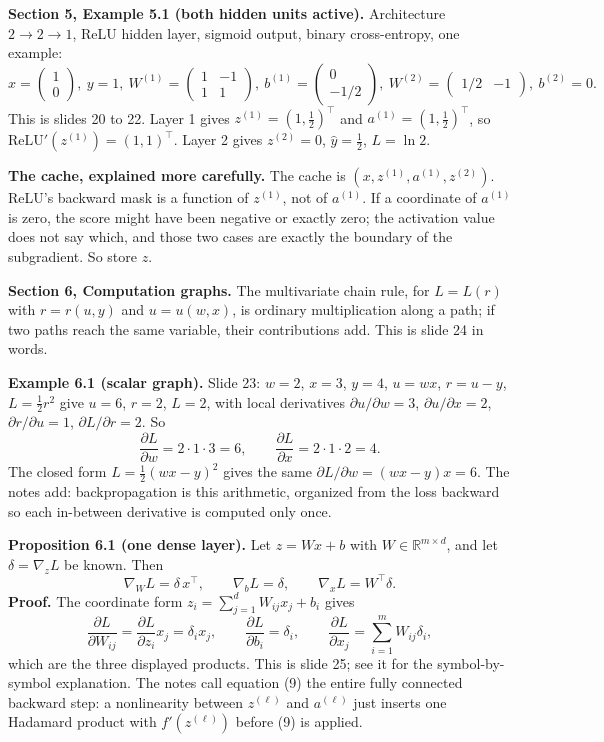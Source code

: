 \textbf{Section 5, Example 5.1 (both hidden units active).} Architecture $2\to2\to1$, ReLU hidden layer, sigmoid output, binary cross-entropy, one example:
\[
x=\begin{pmatrix}1\\0\end{pmatrix},\ y=1,\ W^{(1)}=\begin{pmatrix}1&-1\\1&1\end{pmatrix},\ b^{(1)}=\begin{pmatrix}0\\-1/2\end{pmatrix},\ W^{(2)}=\begin{pmatrix}1/2&-1\end{pmatrix},\ b^{(2)}=0. \tag{8}
\]
This is slides 20 to 22. Layer 1 gives $z^{(1)}=(1,\tfrac12)^\top$ and $a^{(1)}=(1,\tfrac12)^\top$, so $\text{ReLU}'(z^{(1)})=(1,1)^\top$. Layer 2 gives $z^{(2)}=0$, $\hat{y}=\tfrac12$, $L=\ln2$.

\textbf{The cache, explained more carefully.} The cache is $(x,z^{(1)},a^{(1)},z^{(2)})$. ReLU's backward mask is a function of $z^{(1)}$, not of $a^{(1)}$. If a coordinate of $a^{(1)}$ is zero, the score might have been negative or exactly zero; the activation value does not say which, and those two cases are exactly the boundary of the subgradient. So store $z$.

\textbf{Section 6, Computation graphs.} The multivariate chain rule, for $L=L(r)$ with $r=r(u,y)$ and $u=u(w,x)$, is ordinary multiplication along a path; if two paths reach the same variable, their contributions add. This is slide 24 in words.

\textbf{Example 6.1 (scalar graph).} Slide 23: $w=2$, $x=3$, $y=4$, $u=wx$, $r=u-y$, $L=\tfrac12r^2$ give $u=6$, $r=2$, $L=2$, with local derivatives $\partial u/\partial w=3$, $\partial u/\partial x=2$, $\partial r/\partial u=1$, $\partial L/\partial r=2$. So
\[
\frac{\partial L}{\partial w}=2\cdot1\cdot3=6, \qquad \frac{\partial L}{\partial x}=2\cdot1\cdot2=4 .
\]
The closed form $L=\tfrac12(wx-y)^2$ gives the same $\partial L/\partial w=(wx-y)x=6$. The notes add: backpropagation is this arithmetic, organized from the loss backward so each in-between derivative is computed only once.

\textbf{Proposition 6.1 (one dense layer).} Let $z=Wx+b$ with $W\in\mathbb{R}^{m\times d}$, and let $\delta=\nabla_zL$ be known. Then
\[
\nabla_WL=\delta\,x^\top, \qquad \nabla_bL=\delta, \qquad \nabla_xL=W^\top\delta. \tag{9}
\]
\textbf{Proof.} The coordinate form $z_i=\sum_{j=1}^dW_{ij}x_j+b_i$ gives
\[
\frac{\partial L}{\partial W_{ij}}=\frac{\partial L}{\partial z_i}x_j=\delta_ix_j, \qquad \frac{\partial L}{\partial b_i}=\delta_i, \qquad \frac{\partial L}{\partial x_j}=\sum_{i=1}^mW_{ij}\delta_i,
\]
which are the three displayed products. This is slide 25; see it for the symbol-by-symbol explanation. The notes call equation (9) the entire fully connected backward step: a nonlinearity between $z^{(\ell)}$ and $a^{(\ell)}$ just inserts one Hadamard product with $f'(z^{(\ell)})$ before (9) is applied.

